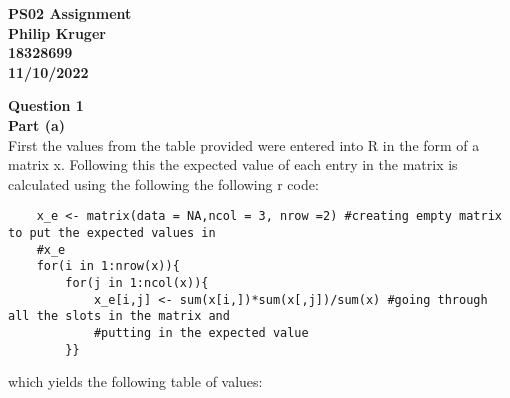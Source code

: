 \documentclass{article}
\begin{document}
	
	\begin{center}
		\textbf{
			{
				\LARGE PS02 Assignment}\\
			Philip Kruger\\
			18328699\\
			11/10/2022\\			
		}
	\end{center}
\textbf{\Large Question 1\\}
\textbf{\large Part (a)\\}
First the values from the table provided were entered into R in the form of a matrix x. Following this the expected value of each entry in the matrix is calculated using the following the following r code:
\begin{verbatim}
	x_e <- matrix(data = NA,ncol = 3, nrow =2) #creating empty matrix to put the expected values in
	#x_e
	for(i in 1:nrow(x)){
	    for(j in 1:ncol(x)){
	        x_e[i,j] <- sum(x[i,])*sum(x[,j])/sum(x) #going through all the slots in the matrix and 
	        #putting in the expected value
	    }}
\end{verbatim}
which yields the following table of values:
\end{document}
